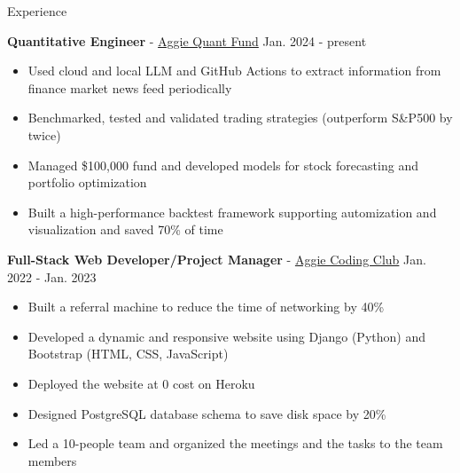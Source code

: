 \documentclass{resume}
\begin{document}
\begin{rSection}{Experience}
    \item \textbf{Quantitative Engineer} - \href{https://www.linkedin.com/company/aggieqf}{Aggie Quant Fund} \hfill Jan. 2024 - present
        \begin{itemize}
        \item Used cloud and local LLM and GitHub Actions to extract information from finance market news feed periodically
        \item Benchmarked, tested and validated trading strategies (outperform S\&P500 by twice)
        \item Managed \$100,000 fund and developed models for stock forecasting and portfolio optimization
        \item Built a high-performance backtest framework supporting automization and visualization and saved 70\% of time
        \end{itemize}

    \item \textbf{Full-Stack Web Developer/Project Manager} - \href{https://aggiecodingclub.com}{Aggie Coding Club} \hfill Jan. 2022 - Jan. 2023
    \begin{itemize}
        \item Built a referral machine to reduce the time of networking by 40\%
        \item Developed a dynamic and responsive website using Django (Python) and Bootstrap (HTML, CSS, JavaScript)
        \item Deployed the website at 0 cost on Heroku
        \item Designed PostgreSQL database schema to save disk space by 20\%
        \item Led a 10-people team and organized the meetings and the tasks to the team members
    \end{itemize}



\end{rSection}
\end{document}
